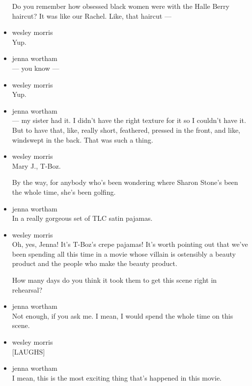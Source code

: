 \begin{itemize}
  Do you remember how obsessed black women were with the Halle Berry
  haircut? It was like our Rachel. Like, that haircut ---
\item
  wesley morris\\
  Yup.
\item
  jenna wortham\\
  --- you know ---
\item
  wesley morris\\
  Yup.
\item
  jenna wortham\\
  --- my sister had it. I didn't have the right texture for it so I
  couldn't have it. But to have that, like, really short, feathered,
  pressed in the front, and like, windswept in the back. That was such a
  thing.
\item
  wesley morris\\
  Mary J., T-Boz.

  By the way, for anybody who's been wondering where Sharon Stone's been
  the whole time, she's been golfing.
\item
  jenna wortham\\
  In a really gorgeous set of TLC satin pajamas.
\item
  wesley morris\\
  Oh, yes, Jenna! It's T-Boz's crepe pajamas! It's worth pointing out
  that we've been spending all this time in a movie whose villain is
  ostensibly a beauty product and the people who make the beauty
  product.

  How many days do you think it took them to get this scene right in
  rehearsal?
\item
  jenna wortham\\
  Not enough, if you ask me. I mean, I would spend the whole time on
  this scene.
\item
  wesley morris\\
  {[}LAUGHS{]}
\item
  jenna wortham\\
  I mean, this is the most exciting thing that's happened in this movie.


\end{itemize}
